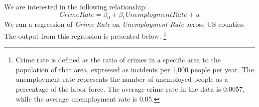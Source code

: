 \documentclass{./../../Latex/handout}
\begin{document}
\thispagestyle{plain}
\vspace{-1em}

We are interested in the following relationship:
$$ Crime Rate = \beta_0 + \beta_1 Unemployment Rate + u  $$
We run a regression of \textit{Crime Rate} on \textit{Unemployment Rate} across US counties. The output from this regression is presented below. \footnote{Crime rate is defined as the ratio of crimes in a specific area to the population of that area, expressed as incidents per 1,000 people per year. The unemployment rate represents the number of unemployed people as a percentage of the labor force. The average crime rate in the data is 0.0057, while the average unemployment rate is 0.05.}
\end{document}
